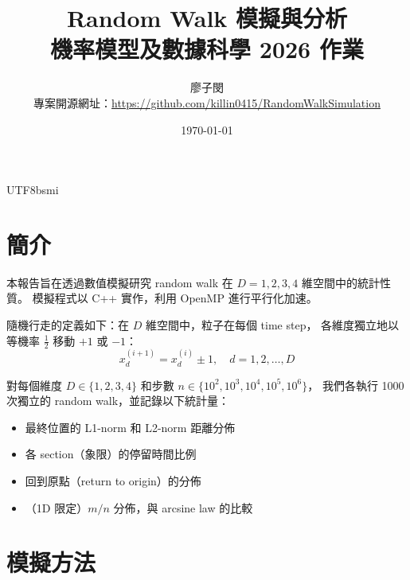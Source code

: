\documentclass[12pt, a4paper]{article}
\begin{document}
\begin{CJK}{UTF8}{bsmi}  %

\title{\textbf{Random Walk 模擬與分析} \\[0.5em]
       \large 機率模型及數據科學 2026 作業}
\author{廖子閔 \\[0.5em] 
        \small 專案開源網址：\url{https://github.com/killin0415/RandomWalkSimulation}}
\date{\today}

\maketitle
\tableofcontents
\newpage

\section{簡介}

本報告旨在透過數值模擬研究 random walk 在 $D = 1, 2, 3, 4$ 維空間中的統計性質。
模擬程式以 C++ 實作，利用 OpenMP 進行平行化加速。

隨機行走的定義如下：在 $D$ 維空間中，粒子在每個 time step，
各維度獨立地以等機率 $\frac{1}{2}$ 移動 $+1$ 或 $-1$：
\begin{equation}
  x_d^{(i+1)} = x_d^{(i)} \pm 1, \quad d = 1, 2, \ldots, D
\end{equation}

對每個維度 $D \in \{1, 2, 3, 4\}$ 和步數 $n \in \{10^2, 10^3, 10^4, 10^5, 10^6\}$，
我們各執行 1000 次獨立的 random walk，並記錄以下統計量：
\begin{itemize}[nosep]
  \item 最終位置的 L1-norm 和 L2-norm 距離分佈
  \item 各 section（象限）的停留時間比例
  \item 回到原點（return to origin）的分佈
  \item（1D 限定）$m/n$ 分佈，與 arcsine law 的比較
\end{itemize}

\section{模擬方法}


\end{CJK}
\end{document}

